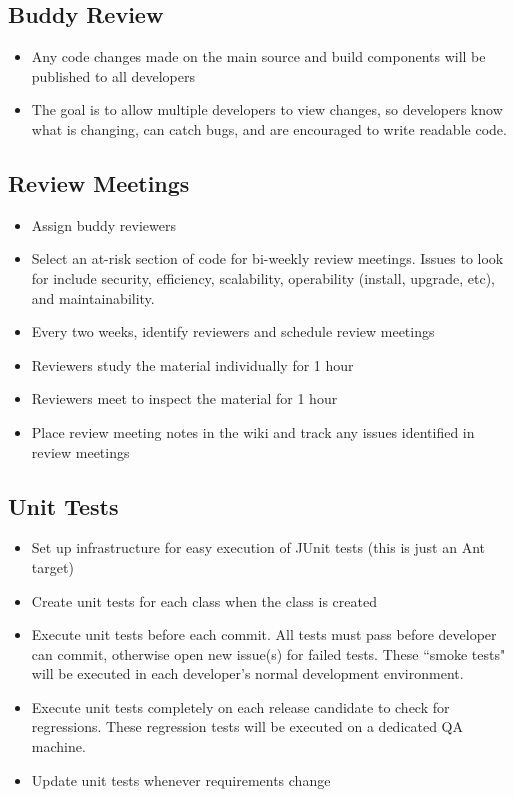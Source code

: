 \documentclass[11pt]{article}
\begin{document}
\subsection{Buddy Review}

\begin{itemize}

\item Any code changes made on the main source and build components will be published to all developers
\item The goal is to allow multiple developers to view changes, so developers know what is changing, can catch bugs, and are encouraged to write readable code.
\end{itemize}

\subsection{Review Meetings}

\begin{itemize}

\item Assign buddy reviewers
\item Select an at-risk section of code for bi-weekly review meetings. Issues to look for include security, efficiency, scalability, operability (install, upgrade, etc), and maintainability.
\item Every two weeks, identify reviewers and schedule review meetings
\item Reviewers study the material individually for 1 hour
\item Reviewers meet to inspect the material for 1 hour
\item Place review meeting notes in the wiki and track any issues identified in review meetings
\end{itemize}

\subsection{Unit Tests}

\begin{itemize}
\item Set up infrastructure for easy execution of JUnit tests (this is just an Ant target)
\item Create unit tests for each class when the class is created
\item Execute unit tests before each commit. All tests must pass before developer can commit, otherwise open new issue(s) for failed tests. These ``smoke tests" will be executed in each developer's normal development environment.
\item Execute unit tests completely on each release candidate to check for regressions. These regression tests will be executed on a dedicated QA machine.
\item Update unit tests whenever requirements change
\end{itemize}
\end{document}
